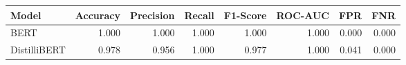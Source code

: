 \begin{tabular}{|l||r|r|r|r|r|r|r|}
\toprule
Model & \textbf{Accuracy} & \textbf{Precision} & Recall & \textbf{F1-Score} & \textbf{ROC-AUC} & \textbf{FPR} & FNR \\
\midrule \midrule
BERT & 1.000 & 1.000 & 1.000 & 1.000 & 1.000 & 0.000 & 0.000 \\
DistilliBERT & 0.978 & 0.956 & 1.000 & 0.977 & 1.000 & 0.041 & 0.000 \\
\bottomrule
\end{tabular}
